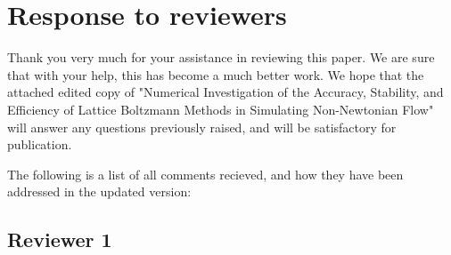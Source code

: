 \documentclass{article}
\begin{document}
	
\section{Response to reviewers}

Thank you very much for your assistance in reviewing this paper. We are sure that with your help, this has become a much better work. We hope that the attached edited copy of "Numerical Investigation of the Accuracy, Stability, and Efficiency of Lattice Boltzmann Methods in Simulating Non-Newtonian Flow" will answer any questions previously raised, and will be satisfactory for publication.

The following is a list of all comments recieved, and how they have been addressed in the updated version:

  
  \subsection{Reviewer 1}
\end{document}
